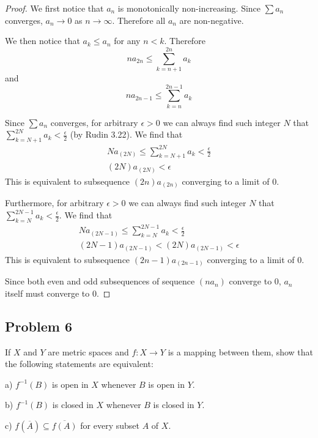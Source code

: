 \documentclass{article}
\theoremstyle{remark}
\begin{document}
\begin{proof}

We first notice that $a_n$ is monotonically non-increasing.
Since $\sum a_n$ converges, $a_n \to 0$ as $n \to \infty$.
Therefore all $a_n$ are non-negative.

We then notice that $a_{k} \leq a_n$ for any $n < k$. Therefore
\[ n a_{2n} \leq \sum_{k=n+1}^{2n} a_k \]
and 
\[ n a_{2n-1} \leq \sum_{k=n}^{2n-1} a_k \]

Since $\sum a_n$ converges, for arbitrary $\epsilon>0$ we can always find such integer $N$ that $\sum_{k=N+1}^{2N} a_k < \frac{\epsilon}{2}$ (by Rudin 3.22).
We find that
\begin{gather*}
    N a_{(2N)} \leq \sum_{k=N+1}^{2N} a_k < \frac{\epsilon}{2} \\ 
    (2N) a_{(2N)} < \epsilon    
\end{gather*}
This is equivalent to subsequence $(2n) a_{(2n)}$ converging to a limit of $0$.

Furthermore, for arbitrary $\epsilon>0$ we can always find such integer $N$ that $\sum_{k=N}^{2N-1} a_k < \frac{\epsilon}{2}$.
We find that
\begin{gather*}
    N a_{(2N-1)} \leq \sum_{k=N}^{2N-1} a_k < \frac{\epsilon}{2} \\
    (2N-1) a_{(2N-1)} < (2N) a_{(2N-1)} < \epsilon     
\end{gather*}
This is equivalent to subsequence $(2n-1) a_{(2n-1)}$ converging to a limit of $0$.

Since both even and odd subsequences of sequence $(n a_n)$ converge to $0$, $a_n$ itself must converge to $0$. 

\end{proof}


\subsection*{Problem 6}

\begin{tcolorbox}
If $X$ and $Y$ are metric spaces and $f : X \to Y$ is a mapping between them, show that the following statements are equivalent:

a) $f^{-1} (B)$ is open in $X$ whenever $B$ is open in $Y$.

b) $f^{-1} (B)$ is closed in $X$ whenever $B$ is closed in $Y$.

c) $f(\overline{A}) \subseteq \overline{f(A)}$ for every subset $A$ of $X$.
\end{tcolorbox}
\end{document}
